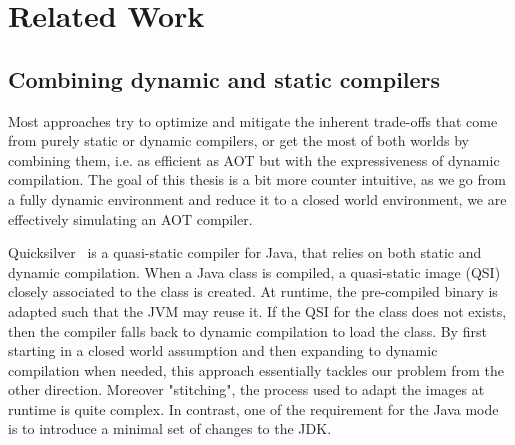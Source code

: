 \chapter{Related Work}

\section{Combining dynamic and static compilers}
Most approaches try to optimize and mitigate the inherent trade-offs that come from purely static or dynamic compilers, or get the most of both worlds by combining them, i.e. as efficient as AOT but with the expressiveness of dynamic compilation.
The goal of this thesis is a bit more counter intuitive, as we go from a fully dynamic environment and reduce it to a closed world environment, we are effectively simulating an AOT compiler.

Quicksilver~\cite{serrano_quicksilver_2000} is a quasi-static compiler for Java, that relies on both static and dynamic compilation. 
When a Java class is compiled, a quasi-static image (QSI) closely associated to the class is created. At runtime, the pre-compiled binary is adapted such that the JVM may reuse it. If the QSI for the class does not exists, then the compiler falls back to dynamic compilation to load the class. 
By first starting in a closed world assumption and then expanding to dynamic compilation when needed, this approach essentially tackles our problem from the other direction.
Moreover "stitching", the process used to adapt the images at runtime is quite complex. In contrast, one of the requirement for the Java mode is to introduce a minimal set of changes to the JDK.

